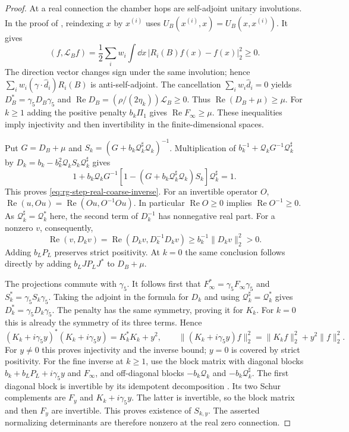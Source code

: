 \begin{proof}
At a real connection the chamber hops are self-adjoint
unitary involutions. In the proof of
, reindexing $x$ by $x^{(i)}$
uses
$U_B(x^{(i)},x)=\overline{U_B(x,x^{(i)})}$.
It gives
\[
 (f,\mathcal L_Bf)=\frac12\sum_iw_i
                  \int\dd x\,|R_i(B)f(x)-f(x)|_2^2\ge0.
\]
The direction vector changes sign under the same
involution; hence
$\sum_iw_i(\gamma\cdot\widehat d_i)R_i(B)$
is anti-self-adjoint. The cancellation
$\sum_iw_i\widehat d_i=0$ yields
$D_B^*=\gamma_5D_B\gamma_5$ and
$\operatorname{Re}D_B=(\rho/(2\eta_k))\mathcal L_B\ge0$.
Thus $\operatorname{Re}(D_B+\mu)\ge\mu$.
For $k\ge1$ adding the positive penalty
$b_k\Pi_1$ gives $\operatorname{Re}F_\infty\ge\mu$.
These inequalities imply injectivity and then
invertibility in the finite-dimensional spaces.

Put $G=D_B+\mu$ and $S_k=(G+b_k\mathcal Q_k^\sharp
\mathcal Q_k)^{-1}$. Multiplication of
$b_k^{-1}+\mathcal Q_kG^{-1}\mathcal Q_k^\sharp$
by $D_k=b_k-b_k^2\mathcal Q_kS_k\mathcal Q_k^\sharp$
gives
\[
 1+b_k\mathcal Q_kG^{-1}
      [1-(G+b_k\mathcal Q_k^\sharp\mathcal Q_k)S_k]
                                               \mathcal Q_k^\sharp=1.
\]
This proves \eqref{eq:rg-step-real-coarse-inverse}.
For an invertible operator $O$,
$\operatorname{Re}(u,Ou)=
\operatorname{Re}(Ou,O^{-1}Ou)$.
In particular $\operatorname{Re}O\ge0$ implies
$\operatorname{Re}O^{-1}\ge0$.
As $\mathcal Q_k^\sharp=\mathcal Q_k^*$ here,
the second term of $D_k^{-1}$ has nonnegative real
part. For a nonzero $v$, consequently,
\[
 \operatorname{Re}(v,D_kv)
       =\operatorname{Re}(D_kv,D_k^{-1}D_kv)
                           \ge b_k^{-1}\|D_kv\|_2^2>0.
\]
Adding $b_LP_L$ preserves strict positivity.
At $k=0$ the same conclusion follows directly by
adding $b_LJP_LJ^*$ to $D_B+\mu$.

The projections commute with $\gamma_5$.
It follows first that
$F_\infty^*=\gamma_5F_\infty\gamma_5$ and
$S_k^*=\gamma_5S_k\gamma_5$.
Taking the adjoint in the formula for $D_k$ and using
$\mathcal Q_k^\sharp=\mathcal Q_k^*$ gives
$D_k^*=\gamma_5D_k\gamma_5$. The penalty has the
same symmetry, proving it for $K_k$.
For $k=0$ this is already the symmetry of its three
terms. Hence
\[
 (K_k+i\gamma_5y)^*(K_k+i\gamma_5y)
                                      =K_k^*K_k+y^2,
 \qquad
 \|(K_k+i\gamma_5y)f\|_2^2
                         =\|K_kf\|_2^2+y^2\|f\|_2^2.
\]
For $y\ne0$ this proves injectivity and the inverse
bound; $y=0$ is covered by strict positivity.
For the fine inverse at $k\ge1$, use the block
matrix with diagonal blocks
$b_k+b_LP_L+i\gamma_5y$ and $F_\infty$,
and off-diagonal blocks
$-b_k\mathcal Q_k$ and $-b_k\mathcal Q_k^\sharp$.
The first diagonal block is invertible by its
idempotent decomposition
.
Its two Schur complements are $F_y$ and
$K_k+i\gamma_5y$. The latter is invertible,
so the block matrix and then $F_y$ are invertible.
This proves existence of $S_{k,y}$.
The asserted normalizing determinants are therefore
nonzero at the real zero connection.
\end{proof}

